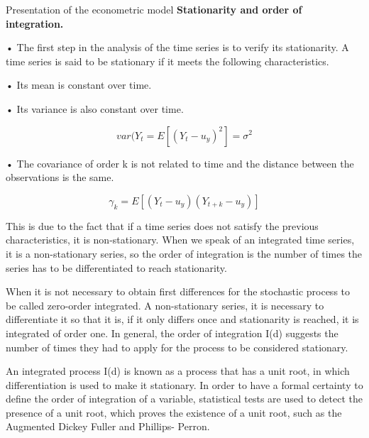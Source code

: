 \begin{frame}{Presentation of the econometric model}
\textbf{Stationarity and order of integration.}\par
•	The first step in the analysis of the time series is to verify its stationarity. A time series is said to be stationary if it meets the following characteristics.\par
•	Its mean is constant over time.\par
•	Its variance is also constant over time.\par

 \begin{equation}
 var(Y_{t} = E[(Y_{t}-u_{y})^2]=	\sigma^2
 \end{equation}
 
•	The covariance of order k is not related to time and the distance between the observations is the same.\par

  \begin{equation}
 \gamma_{k}=E[(Y_{t}-u_{y})(Y_{t+k}-u_{y})]
 \end{equation}
 
This is due to the fact that if a time series does not satisfy the previous characteristics, it is non-stationary. When we speak of an integrated time series, it is a non-stationary series, so the order of integration is the number of times the series has to be differentiated to reach stationarity.\par
When it is not necessary to obtain first differences for the stochastic process to be called zero-order integrated. A non-stationary series, it is necessary to differentiate it so that it is, if it only differs once and stationarity is reached, it is integrated of order one. In general, the order of integration I(d) suggests the number of times they had to apply for the process to be considered stationary.\par
An integrated process I(d) is known as a process that has a unit root, in which differentiation is used to make it stationary. In order to have a formal certainty to define the order of integration of a variable, statistical tests are used to detect the presence of a unit root, which proves the existence of a unit root, such as the Augmented Dickey Fuller and Phillips- Perron.\par
\end{frame}

